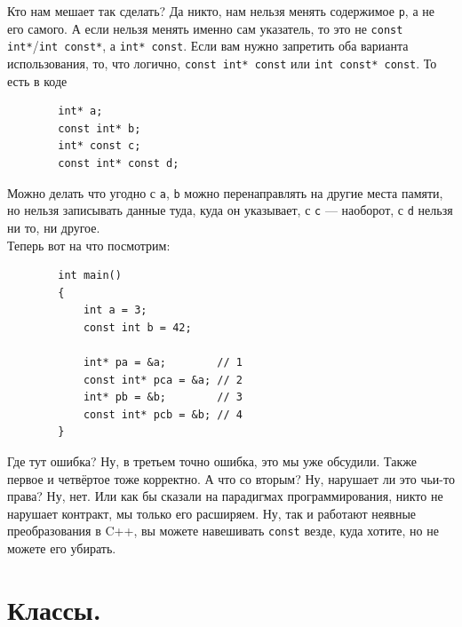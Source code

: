 \documentclass{article}
\begin{document}
    Кто нам мешает так сделать? Да никто, нам нельзя менять содержимое \texttt{p}, а не его самого. А если нельзя менять именно сам указатель, то это не \texttt{const int*}/\texttt{int const*}, а \texttt{int* const}. Если вам нужно запретить оба варианта использования, то, что логично, \texttt{const int* const} или \texttt{int const* const}. То есть в коде
    \begin{verbatim}
        int* a;
        const int* b;
        int* const c;
        const int* const d;
    \end{verbatim}
    Можно делать что угодно с \texttt{a}, \texttt{b} можно перенаправлять на другие места памяти, но нельзя записывать данные туда, куда он указывает, с \texttt{c} --- наоборот, с \texttt{d} нельзя ни то, ни другое.\\
    Теперь вот на что посмотрим:
    \begin{verbatim}
        int main()
        {
            int a = 3;
            const int b = 42;

            int* pa = &a;        // 1
            const int* pca = &a; // 2
            int* pb = &b;        // 3
            const int* pcb = &b; // 4
        }
    \end{verbatim}
    Где тут ошибка? Ну, в третьем точно ошибка, это мы уже обсудили. Также первое и четвёртое тоже корректно. А что со вторым? Ну, нарушает ли это чьи-то права? Ну, нет. Или как бы сказали на парадигмах программирования, никто не нарушает контракт, мы только его расширяем. Ну, так и работают неявные преобразования в C++, вы можете навешивать \texttt{const} везде, куда хотите, но не можете его убирать.
    \section{Классы.}
\end{document}
